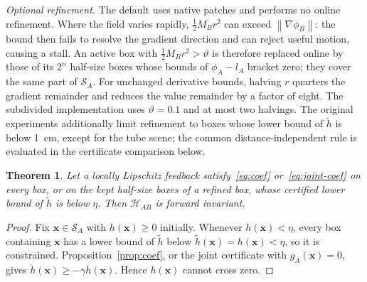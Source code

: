 \documentclass[journal]{IEEEtran}
\newtheorem{theorem}{Theorem}
\theoremstyle{definition}
\newcommand{\norm}[1]{\left\lVert #1\right\rVert}
\begin{document}
\emph{Optional refinement.} The default uses native patches and performs no online refinement.
Where the field varies rapidly, $\frac12M_Br^2$ can exceed
$\norm{\nabla\phi_B}$: the bound then fails to resolve the gradient direction and can reject useful
motion, causing a stall. An active box
with $\frac12M_Br^2>\vartheta$ is therefore replaced online by those of its $2^n$ half-size boxes whose
bounds of $\phi_A-l_A$ bracket zero; they cover the same part of $\mathcal S_A$.
For unchanged derivative bounds, halving $r$ quarters the gradient remainder and reduces the
value remainder by a factor of eight. The subdivided implementation uses $\vartheta=0.1$ and at most two halvings.
The original experiments additionally limit refinement to boxes whose lower bound of $\tilde h$
is below 1~cm, except for the tube scene; the common distance-independent rule is evaluated
in the certificate comparison below.
\begin{theorem}\label{thm:invariance}
Let a locally Lipschitz feedback satisfy~\eqref{eq:coef} or~\eqref{eq:joint-coef} on every box, or on the kept half-size boxes of
a refined box, whose certified lower bound of $\tilde h$ is below $\eta$. Then $\mathcal H_{AB}$ is
forward invariant.
\end{theorem}
\begin{proof}
Fix $\mathbf x\in\mathcal S_A$ with $h(\mathbf x)\ge0$ initially. Whenever $h(\mathbf x)<\eta$, every
box containing $\mathbf x$ has a lower bound of $\tilde h$ below $\tilde h(\mathbf x)=h(\mathbf x)<\eta$,
so it is constrained. Proposition~\ref{prop:coef}, or the joint certificate with $g_A(\mathbf x)=0$, gives
$\dot h(\mathbf x)\ge-\gamma h(\mathbf x)$. Hence
$h(\mathbf x)$ cannot cross zero.
\end{proof}
\end{document}
